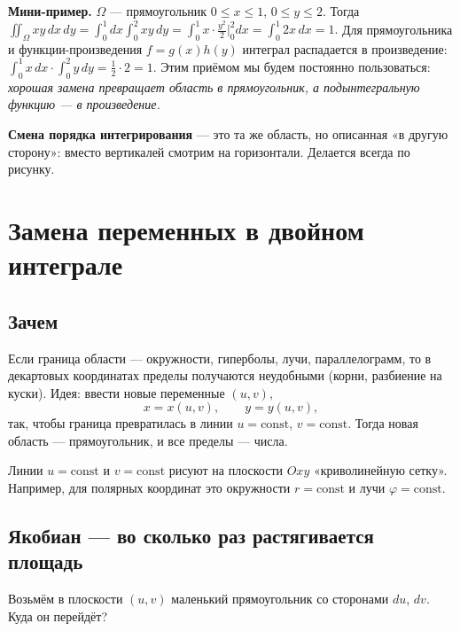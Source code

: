 \textbf{Мини-пример.} $\Omega$ --- прямоугольник $0\leqslant x\leqslant1$, $0\leqslant y\leqslant2$. Тогда
$\iint_\Omega xy\,dx\,dy=\int_0^1 dx\int_0^2 xy\,dy=\int_0^1 x\cdot\frac{y^2}{2}\Big|_0^2dx=\int_0^1 2x\,dx=1.$
Для прямоугольника и функции-произведения $f=g(x)h(y)$ интеграл распадается в произведение: $\int_0^1x\,dx\cdot\int_0^2y\,dy=\frac12\cdot2=1$. Этим приёмом мы будем постоянно пользоваться: \emph{хорошая замена превращает область в прямоугольник, а подынтегральную функцию --- в произведение.}

\textbf{Смена порядка интегрирования} --- это та же область, но описанная «в другую сторону»: вместо вертикалей смотрим на горизонтали. Делается всегда по рисунку.

\section{Замена переменных в двойном интеграле}
\subsection{Зачем}
Если граница области --- окружности, гиперболы, лучи, параллелограмм, то в декартовых координатах пределы получаются неудобными (корни, разбиение на куски). Идея: ввести новые переменные $(u,v)$,
\[
x=x(u,v),\qquad y=y(u,v),
\]
так, чтобы граница превратилась в линии $u=\mathrm{const}$, $v=\mathrm{const}$. Тогда новая область --- прямоугольник, и все пределы --- числа.

Линии $u=\mathrm{const}$ и $v=\mathrm{const}$ рисуют на плоскости $Oxy$ «криволинейную сетку». Например, для полярных координат это окружности $r=\mathrm{const}$ и лучи $\varphi=\mathrm{const}$.

\subsection{Якобиан --- во сколько раз растягивается площадь}

Возьмём в плоскости $(u,v)$ маленький прямоугольник со сторонами $du$, $dv$. Куда он перейдёт?

